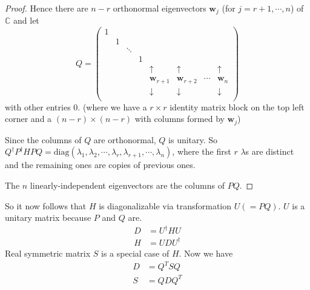 \documentclass[a4paper]{article}
\theoremstyle{definition}
\newcommand{\mb}[1]{\mathbf{#1}}
\newcommand{\C}{\mathbb{C}}
\begin{document}
\begin{proof}
Hence there are $n -r $ orthonormal eigenvectors $\mb{w}_j$ (for $j = r + 1, \cdots, n$) of $\C$ and let
\[
Q = 
\begin{pmatrix}
  1 \\
  & 1\\
  && \ddots\\
  &&& 1\\
  &&&& \uparrow & \uparrow & &\uparrow\\
  &&&& \mb{w}_{r+1} & \mb{w}_{r + 2} & \cdots & \mb{w}_n\\
  &&&& \downarrow & \downarrow & &\downarrow\\
\end{pmatrix}
\]
with other entries $0$. (where we have a $r\times r$ identity matrix block on the top left corner and a $(n - r) \times (n -r)$ with columns formed by $\mb{w}_j$)

Since the columns of $Q$ are orthonormal, $Q$ is unitary. So $Q^\dagger P^\dagger HPQ = \mathrm{diag}(\lambda_1, \lambda_2, \cdots, \lambda_r, \lambda_{r + 1}, \cdots, \lambda_n)$, where the first $r$ $\lambda$s are distinct and the remaining ones are copies of previous ones.

The $n$ linearly-independent eigenvectors are the columns of $PQ$.

\end{proof}
So it now follows that $H$ is diagonalizable via transformation $U (=PQ)$. $U$ is a unitary matrix because $P$ and $Q$ are.
\begin{align*}
  D &= U^\dagger HU\\
  H &= UDU^\dagger
\end{align*}
Real symmetric matrix $S$ is a special case of $H$. Now we have
\begin{align*}
  D &= Q^T SQ\\
  S &= QDQ^T
\end{align*}
\end{document}
